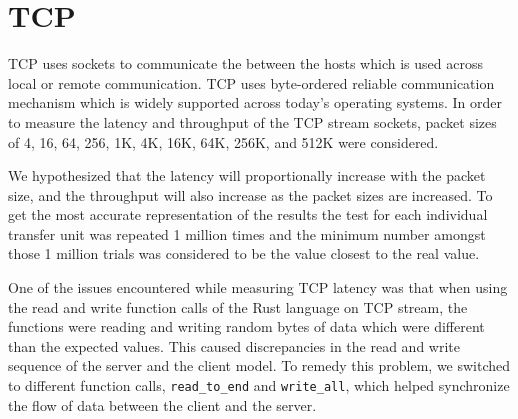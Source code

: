 \section{TCP}
TCP uses sockets to communicate the between the hosts which is used across local or remote communication. TCP uses byte-ordered reliable communication mechanism which is widely supported across today's operating systems. In order to measure the latency and throughput of the TCP stream sockets, packet sizes of 4, 16, 64, 256, 1K, 4K, 16K, 64K, 256K, and 512K were considered.

We hypothesized that the latency will proportionally increase with the packet size, and the throughput will also increase as the packet sizes are increased. To get the most accurate representation of the results the test for each individual transfer unit was repeated 1 million times and the minimum number amongst those 1 million trials was considered to be the value closest to the real value.

One of the issues encountered while measuring TCP latency was that when using the read and write function calls of the Rust language on TCP stream, the functions were reading and writing random bytes of data which were different than the expected values. This caused discrepancies in the read and write sequence of the server and the client model. To remedy this problem, we switched to different function calls, \texttt{read\_to\_end} and \texttt{write\_all}, which helped synchronize the flow of data between the client and the server.
